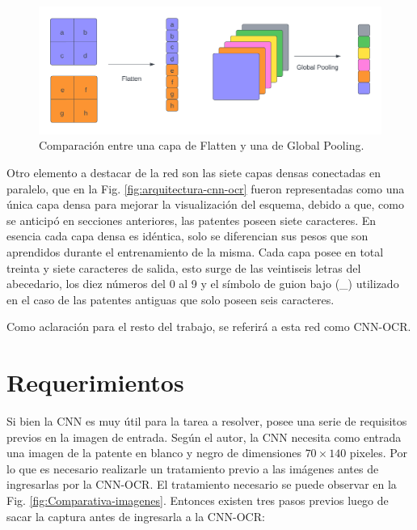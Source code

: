 \begin{figure}[bth]
    \centering
    \includegraphics[width=.8\textwidth]{imgs/flatten-pooling.png}
    \caption{Comparación entre una capa de Flatten y una de Global Pooling.}
    \label{fig:flatten-pooling}
\end{figure}

Otro elemento a destacar de la red son las siete capas densas conectadas en paralelo, que en la Fig. \ref{fig:arquitectura-cnn-ocr} fueron representadas como una única capa densa para mejorar la visualización del esquema, debido a que, como se anticipó en secciones anteriores, las patentes poseen siete caracteres. En esencia cada capa densa es idéntica, solo se diferencian sus pesos que son aprendidos durante el entrenamiento de la misma. Cada capa posee en total treinta y siete caracteres de salida, esto surge de las veintiseis letras del abecedario, los diez números del 0 al 9 y el símbolo de guion bajo (\_) utilizado en el caso de las patentes antiguas que solo poseen seis caracteres.

Como aclaración para el resto del trabajo, se referirá a esta red como CNN-OCR.

\section{Requerimientos}

Si bien la CNN es muy útil para la tarea a resolver, posee una serie de requisitos previos en la imagen de entrada. Según el autor, la CNN
necesita como entrada una imagen de la patente en blanco y negro de dimensiones $70 \times 140$ pixeles.
Por lo que es necesario realizarle un tratamiento previo a las imágenes antes de ingresarlas por la CNN-OCR. El tratamiento necesario
se puede observar en la Fig. \ref{fig:Comparativa-imagenes}. Entonces existen tres pasos previos luego de sacar
la captura antes de ingresarla a la CNN-OCR:

